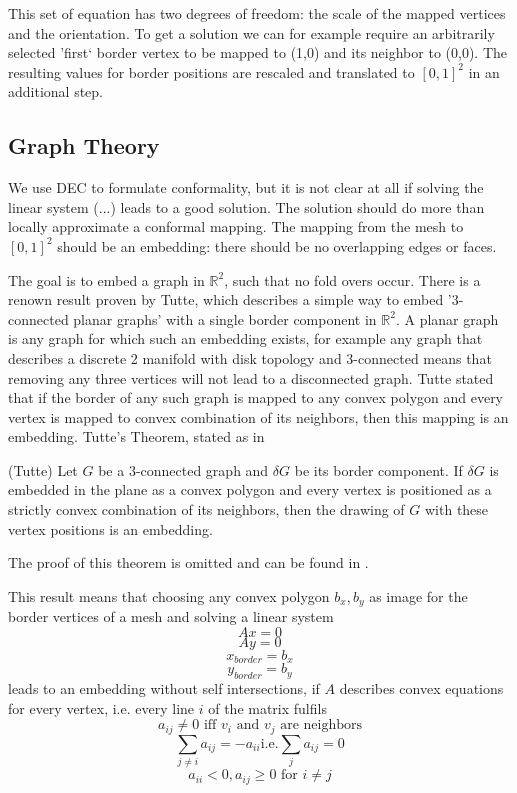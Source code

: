 This set of equation has two degrees of freedom: the scale of the mapped vertices and the orientation. To get a solution we can for example require an arbitrarily selected 'first` border vertex to be mapped to (1,0) and its neighbor to (0,0). The resulting values for border positions are rescaled and translated to $[0,1]^2$ in an additional step.


\subsection{Graph Theory}
We use DEC to formulate conformality, but it is not clear at all if solving the linear system (...) leads to a good solution. The solution should do more than locally approximate a conformal mapping. The mapping from the mesh to $[0,1]^2$ should be an embedding: there should be no overlapping edges or faces. 

The goal is to embed a graph in $\mathbb R^2$, such that no fold overs occur. There is a renown result proven by Tutte, which describes a simple way to embed '3-connected planar graphs' with a single border component in $\mathbb R^2$. A planar graph is any graph for which such an embedding exists, for example any graph that describes a discrete 2 manifold with disk topology and 3-connected means that removing any three vertices will not lead to a disconnected graph. Tutte stated that if the border of any such graph is mapped to any convex polygon and every vertex is mapped to convex combination of its neighbors, then this mapping is an embedding. Tutte's Theorem, stated as in 

\begin{thm}(Tutte) Let $G$ be a $3$-connected graph and $\delta G$ be its border component. If $\delta G$ is embedded in the plane as a convex polygon and every vertex is positioned as a strictly convex combination of its neighbors, then the drawing of $G$ with these vertex positions is an embedding.
\end{thm}
The proof of this theorem is omitted and can be found in . 

This result means that choosing any convex polygon $b_x, b_y$ as image for the border vertices of a mesh and solving a linear system
\[Ax = 0\]
\[Ay = 0\]
\[x_{border} = b_x\]
\[y_{border} = b_y\]
leads to an embedding without self intersections, if $A$ describes convex equations for every vertex, i.e. every line $i$ of the matrix fulfils
\begin{equation}
a_{ij} \neq 0 \text{ iff $v_i$ and $v_j$ are neighbors} \label{eqn:tutte1}
\end{equation}
\begin{equation}
\sum_{j\neq i} a_{ij} = - a_{ii} \text{i.e.} \sum_{j} a_{ij} = 0\label{eqn:tutte2}
\end{equation}
\begin{equation}
a_{ii} <0, a_{ij} \geq 0 \text{ for $i\neq j$}\label{eqn:tutte3}
\end{equation}

